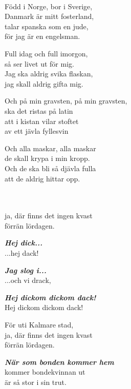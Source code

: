\newpage

 \\       

\songtext{}
Född i Norge, bor i Sverige,\\
Danmark är mitt fosterland,\\
talar spanska som en jude,\\
för jag är en engelsman.

Full idag och full imorgon,\\
så ser livet ut för mig.\\
Jag ska aldrig svika flaskan,\\
jag skall aldrig gifta mig.

Och på min gravsten, på min gravsten,\\
ska det ristas på latin\\
att i kistan vilar stoftet\\
av ett jävla fyllesvin

Och alla maskar, alla maskar\\
de skall krypa i min kropp.\\
Och de ska bli så djävla fulla\\
att de aldrig hittar opp.

\newpage


\vspace{0.15cm}
\melochtext{}\\
\\
ja, där finns det ingen kvast\\
förrän lördagen.

\textbf{\textit{Hej dick...}}\\
...hej dack!

\textbf{\textit{Jag slog i...}}\\
...och vi drack,

\textbf{\textit{Hej dickom dickom dack!}}\\
Hej dickom dickom dack!

För uti Kalmare stad, \\
ja, där finns det ingen kvast\\
förrän lördagen.

\leftrepeat \textbf{\textit{När som bonden kommer hem}}\\
kommer bondekvinnan ut \rightrepeat\\
är så stor i sin trut.

